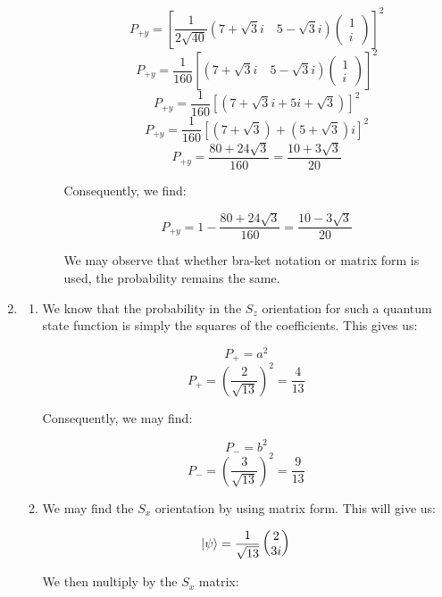 \begin{enumerate}
\begin{enumerate}
\begin{enumerate}
            $$P_{+y}=\left[\frac{1}{2\sqrt{40}}\left( 7+\sqrt{3}i \quad 5-\sqrt{3}i \right)\left( \begin{matrix} 1\\ i\end{matrix} \right)\right]^2$$
            $$P_{+y}=\frac{1}{160}\left[\left( 7+\sqrt{3}i \quad 5-\sqrt{3}i \right)\left( \begin{matrix} 1\\ i\end{matrix} \right)\right]^2$$
            $$P_{+y}=\frac{1}{160}\left[\left( 7+\sqrt{3}i +5i+\sqrt{3} \right)\right]^2$$
            $$P_{+y}=\frac{1}{160}\left[(7+\sqrt{3})+(5+\sqrt{3})i\right]^2$$
            $$\boxed{P_{+y}=\frac{80+24\sqrt{3}}{160}=\frac{10+3\sqrt{3}}{20}}$$

            Consequently, we find:

            $$\boxed{P_{+y}=1-\frac{80+24\sqrt{3}}{160}=\frac{10-3\sqrt{3}}{20}}$$

            We may observe that whether bra-ket notation or matrix form is used, the probability remains the same.

        \end{enumerate}

    \end{enumerate}

  \item 

    \begin{enumerate}

      \item We know that the probability in the $S_z$ orientation for such a quantum state function is simply the squares of the coefficients. This gives us:

        $$P_+=a^2$$
        $$\boxed{P_+=\left(\frac{2}{\sqrt{13}}\right)^2=\frac{4}{13}}$$

        Consequently, we may find:

        $$P_-=b^2$$
        $$\boxed{P_-=\left(\frac{3}{\sqrt{13}}\right)^2=\frac{9}{13}}$$

      \item We may find the $S_x$ orientation by using matrix form. This will give us:

        $$\ket{\psi}=\frac{1}{\sqrt{13}}\left( \begin{matrix} 2\\ 3i \end{matrix}\right)$$

        We then multiply by the $S_x$ matrix:


\end{enumerate}
\end{enumerate}
